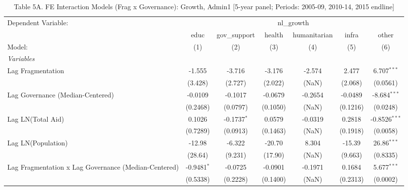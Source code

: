 \begin{table}[H]
   \caption{Table 5A. FE Interaction Models (Frag x Governance): Growth, Admin1 [5-year panel; Periods: 2005-09, 2010-14, 2015 endline]}
   \centering
   \begin{tabular}{lcccccc}
      \tabularnewline \midrule \midrule
      Dependent Variable: & \multicolumn{6}{c}{nl\_growth}\\
                                                           & educ          & gov\_support  & health   & humanitarian & infra    & other \\   
      Model:                                               & (1)           & (2)           & (3)      & (4)          & (5)      & (6)\\  
      \midrule
      \emph{Variables}\\
      Lag Fragmentation                                    & -1.555        & -3.716        & -3.176   & -2.574       & 2.477    & 6.707$^{***}$\\   
                                                           & (3.428)       & (2.727)       & (2.022)  & (NaN)        & (2.068)  & (0.0561)\\   
      Lag Governance (Median-Centered)                     & -0.0109       & -0.1017       & -0.0679  & -0.2654      & -0.0489  & -8.684$^{***}$\\   
                                                           & (0.2468)      & (0.0797)      & (0.1050) & (NaN)        & (0.1216) & (0.0248)\\   
      Lag LN(Total Aid)                                    & 0.1026        & -0.1737$^{*}$ & 0.0579   & -0.0319      & 0.2818   & -0.8526$^{***}$\\   
                                                           & (0.7289)      & (0.0913)      & (0.1463) & (NaN)        & (0.1918) & (0.0058)\\   
      Lag LN(Population)                                   & -12.98        & -6.322        & -20.70   & 8.304        & -15.39   & 26.86$^{***}$\\   
                                                           & (28.64)       & (9.231)       & (17.90)  & (NaN)        & (9.663)  & (0.8335)\\   
      Lag Fragmentation x Lag Governance (Median-Centered) & -0.9481$^{*}$ & -0.0725       & -0.0901  & -0.1971      & 0.1684   & 5.677$^{***}$\\   
                                                           & (0.5338)      & (0.2228)      & (0.1400) & (NaN)        & (0.2313) & (0.0002)\\   

\end{tabular}
\end{table}
